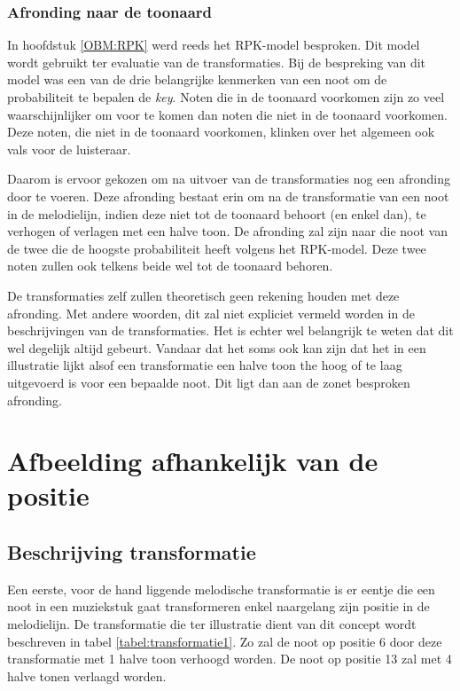 \subsubsection{Afronding naar de toonaard}
\label{sub:afronding}
In hoofdstuk \ref{OBM:RPK} werd reeds het RPK-model besproken. Dit model wordt gebruikt ter evaluatie van de transformaties. Bij de bespreking van dit model was een van de drie belangrijke kenmerken van een noot om de probabiliteit te bepalen de \textit{key}. Noten die in de toonaard voorkomen zijn zo veel waarschijnlijker om voor te komen dan noten die niet in de toonaard voorkomen. Deze noten, die niet in de toonaard voorkomen, klinken over het algemeen ook vals voor de luisteraar. 

Daarom is ervoor gekozen om na uitvoer van de transformaties nog een afronding door te voeren. Deze afronding bestaat erin om na de transformatie van een noot in de melodielijn, indien deze niet tot de toonaard behoort (en enkel dan), te verhogen of verlagen met een halve toon. De afronding zal zijn naar die noot van de twee die de hoogste probabiliteit heeft volgens het RPK-model. Deze twee noten zullen ook telkens beide wel tot de toonaard behoren. 

De transformaties zelf zullen theoretisch geen rekening houden met deze afronding. Met andere woorden, dit zal niet expliciet vermeld worden in de beschrijvingen van de transformaties. Het is echter wel belangrijk te weten dat dit wel degelijk altijd gebeurt. Vandaar dat het soms ook kan zijn dat het in een illustratie lijkt alsof een transformatie een halve toon the hoog of te laag uitgevoerd is voor een bepaalde noot. Dit ligt dan aan de zonet besproken afronding.

\section{Afbeelding afhankelijk van de positie}
\label{MT:positie}
\subsection{Beschrijving transformatie}
Een eerste, voor de hand liggende melodische transformatie is er eentje die een noot in een muziekstuk gaat transformeren enkel naargelang zijn positie in de melodielijn. De transformatie die ter illustratie dient van dit concept wordt beschreven in tabel \ref{tabel:transformatie1}. Zo zal de noot op positie 6 door deze transformatie met 1 halve toon verhoogd worden. De noot op positie 13 zal met 4 halve tonen verlaagd worden. 

